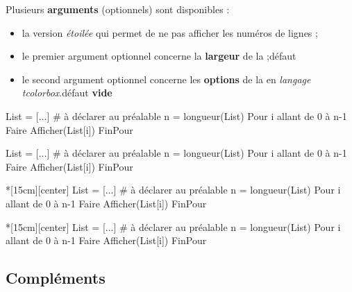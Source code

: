 \documentclass{article}
\newcommand\ctex[1]{\tcbox[vignettelatex]{#1}}
\newcommand\Cle[1]{{\bfseries\sffamily\textlangle #1\textrangle}}
\begin{document}
\begin{codecles}
Plusieurs \Cle{arguments} (optionnels) sont disponibles :

\begin{itemize}
	\item la version \textit{étoilée} qui permet de ne pas afficher les numéros de lignes ;
	\item le premier argument optionnel concerne la \Cle{largeur} de la \ctex{tcbox} ;\hfill{}défaut \Cle{12cm}
	\item le second argument optionnel concerne les \Cle{options} de la \ctex{tcbox} en \textit{langage tcolorbox}.\hfill{}défaut \Cle{vide}
\end{itemize}
\end{codecles}

\begin{codetex}
\begin{envpseudocode} %
List = [...]          # à déclarer au préalable
n = longueur(List)
Pour i allant de 0 à n-1 Faire
	Afficher(List[i])
FinPour
\end{envpseudocode}
\end{codetex}

\begin{codesortie}
\begin{envpseudocode}
List = [...]          # à déclarer au préalable
n = longueur(List)
Pour i allant de 0 à n-1 Faire
	Afficher(List[i])
FinPour
\end{envpseudocode}
\end{codesortie}

\begin{codetex}
\begin{envpseudocode}*[15cm][center] %
List = [...]          # à déclarer au préalable
n = longueur(List)
Pour i allant de 0 à n-1 Faire
	Afficher(List[i])
FinPour
\end{envpseudocode}
\end{codetex}

\begin{codesortie}
\begin{envpseudocode}*[15cm][center]
List = [...]          # à déclarer au préalable
n = longueur(List)
Pour i allant de 0 à n-1 Faire
	Afficher(List[i])
FinPour
\end{envpseudocode}
\end{codesortie}

\subsection{Compléments}
\end{document}
